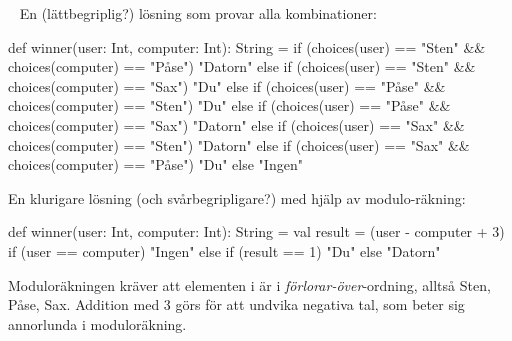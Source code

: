 %
%
%
%
%
%
%



\SOLUTION

\TaskSolved \what~ En (lättbegriplig?) lösning som provar alla kombinationer:

\begin{CodeSmall}
  def winner(user: Int, computer: Int): String =
    if      (choices(user) == "Sten" && choices(computer) == "Påse") "Datorn"
    else if (choices(user) == "Sten" && choices(computer) == "Sax")  "Du"
    else if (choices(user) == "Påse" && choices(computer) == "Sten") "Du"
    else if (choices(user) == "Påse" && choices(computer) == "Sax")  "Datorn"
    else if (choices(user) == "Sax"  && choices(computer) == "Sten") "Datorn"
    else if (choices(user) == "Sax"  && choices(computer) == "Påse") "Du"
    else "Ingen"
\end{CodeSmall}


En klurigare lösning (och svårbegripligare?) med hjälp av modulo-räkning:

\begin{Code}
  def winner(user: Int, computer: Int): String = {
     val result = (user - computer + 3) %
     if (user == computer) "Ingen"
     else if (result == 1) "Du"
     else "Datorn"
  }
\end{Code}
Moduloräkningen kräver att elementen i  är i \emph{förlorar-över}-ordning, alltså Sten, Påse, Sax. Addition med 3 görs för att undvika negativa tal, som beter sig annorlunda i moduloräkning.

\QUESTEND



